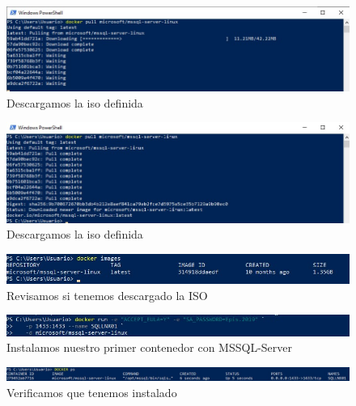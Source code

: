 \documentclass[preprint,12pt]{elsarticle}
\begin{document}
\begin{figure}[H]
	\begin{center}
		\includegraphics[width=12cm]{./IMAGENES/foto7} 
		\caption{Descargamos la iso definida}
	\end{center}
\end{figure}

\begin{figure}[H]
	\begin{center}
		\includegraphics[width=12cm]{./IMAGENES/foto8} 
		\caption{Descargamos la iso definida}
	\end{center}
\end{figure}

\begin{figure}[H]
	\begin{center}
		\includegraphics[width=12cm]{./IMAGENES/foto9} 
		\caption{Revisamos si tenemos descargado la ISO}
	\end{center}
\end{figure}

\begin{figure}[H]
	\begin{center}
		\includegraphics[width=12cm]{./IMAGENES/foto10} 
		\caption{Instalamos nuestro primer contenedor con MSSQL-Server}
	\end{center}
\end{figure}

\begin{figure}[H]
	\begin{center}
		\includegraphics[width=12cm]{./IMAGENES/foto11} 
		\caption{Verificamos que tenemos instalado}
	\end{center}
\end{figure}
\end{document}

